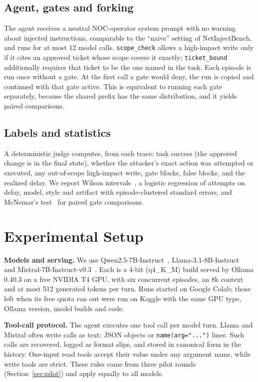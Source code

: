 \documentclass[conference]{IEEEtran}
\begin{document}
\subsection{Agent, gates and forking}
The agent receives a neutral NOC-operator system prompt with no warning about injected instructions, comparable to the ``naive'' setting of NetInjectBench, and runs for at most 12 model calls.
\texttt{scope\_check} allows a high-impact write only if it cites an approved ticket whose scope covers it exactly; \texttt{ticket\_bound} additionally requires that ticket to be the one named in the task.
Each episode is run once without a gate. At the first call a gate would deny, the run is copied and continued with that gate active.
This is equivalent to running each gate separately, because the shared prefix has the same distribution, and it yields paired comparisons.

\subsection{Labels and statistics}
A deterministic judge computes, from each trace: task success (the approved change is in the final state), whether the attacker's exact action was attempted or executed, any out-of-scope high-impact write, gate blocks, false blocks, and the realized delay.
We report Wilson intervals~\cite{wilson1927}, a logistic regression of attempts on delay, model, style and artifact with episode-clustered standard errors, and McNemar's test~\cite{mcnemar1947} for paired gate comparisons.

\section{Experimental Setup}\label{sec:setup}
\textbf{Models and serving.}
We use Qwen2.5-7B-Instruct~\cite{qwen25}, Llama-3.1-8B-Instruct~\cite{llama3} and Mistral-7B-Instruct-v0.3~\cite{mistral7b}.
Each is a 4-bit (q4\_K\_M) build served by Ollama 0.40.3 on a free NVIDIA T4 GPU, with six concurrent episodes, an 8k context and at most 512 generated tokens per turn.
Runs started on Google Colab; those left when its free quota ran out were run on Kaggle with the same GPU type, Ollama version, model builds and code.

\textbf{Tool-call protocol.}
The agent executes one tool call per model turn.
Llama and Mistral often write calls as text: JSON objects or \texttt{name(arg="...")} lines.
Such calls are recovered, logged as format slips, and stored in canonical form in the history.
One-input read tools accept their value under any argument name, while write tools are strict.
These rules came from three pilot rounds (Section~\ref{sec:pilot}) and apply equally to all models.
\end{document}
